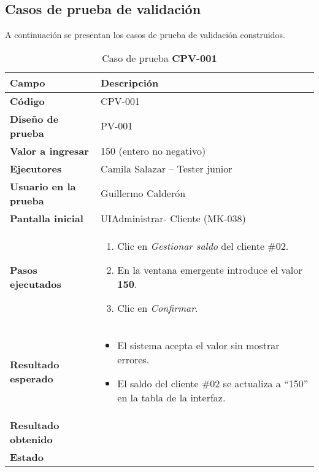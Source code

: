 \subsection{Casos de prueba de validación}
A continuación se presentan los casos de prueba de validación construidos.  

\begin{table}[H]
\centering
\caption{Caso de prueba \textbf{CPV-001}}
\label{tab:cpv001Saldo}
\begin{tabular}{|p{4cm}|p{10.5cm}|}
\hline
\textbf{Campo} & \textbf{Descripción} \\ \hline
\textbf{Código} & CPV-001 \\ \hline
\textbf{Diseño de prueba} & PV-001 \\ \hline
\textbf{Valor a ingresar} & 150 (entero no negativo) \\ \hline
\textbf{Ejecutores} & Camila Salazar – Tester junior \\ \hline
\textbf{Usuario en la prueba} & Guillermo Calderón \\ \hline
\textbf{Pantalla inicial} & UIAdministrar-
Cliente (MK-038) \\ \hline
\textbf{Pasos ejecutados} &
\begin{enumerate}
  \item Clic en \textit{Gestionar saldo} del cliente \#02.
  \item En la ventana emergente introduce el valor \textbf{150}.
  \item Clic en \textit{Confirmar}.
\end{enumerate} \\ \hline
\textbf{Resultado esperado} &
\begin{itemize}
  \item El sistema acepta el valor sin mostrar errores.
  \item El saldo del cliente \#02 se actualiza a “150” en la tabla de la interfaz.
\end{itemize} \\ \hline
\textbf{Resultado obtenido} &  \\ \hline
\textbf{Estado} &  \\ \hline
\end{tabular}
\end{table}

